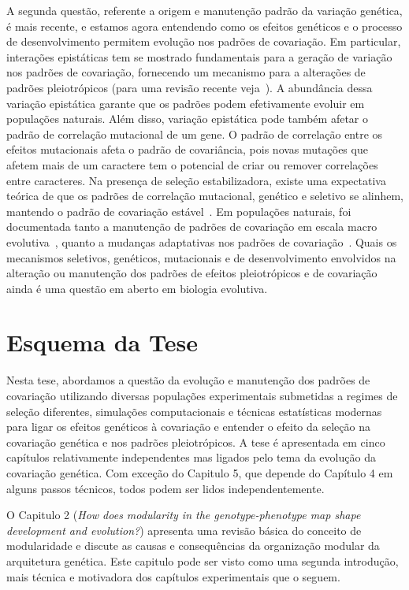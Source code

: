 \begin{refsection}
A segunda questão, referente a origem e manutenção padrão da variação
genética, é mais recente, e estamos agora entendendo como os efeitos genéticos
e o processo de desenvolvimento permitem evolução nos padrões de covariação.
Em particular, interações epistáticas tem se mostrado fundamentais para a
geração de variação nos padrões de covariação, fornecendo um mecanismo para a
alterações de padrões pleiotrópicos (para uma revisão recente
veja~\textcite{Pavlicev2015-up}). A abundância dessa variação epistática
garante que os padrões podem efetivamente evoluir em populações naturais. Além
disso, variação epistática pode também afetar o padrão de correlação
mutacional de um gene. O padrão de correlação entre os efeitos mutacionais
afeta o padrão de covariância, pois novas mutações que afetem mais de um
caractere tem o potencial de criar ou remover correlações entre caracteres. Na
presença de seleção estabilizadora, existe uma expectativa teórica de que os
padrões de correlação mutacional, genético e seletivo se alinhem, mantendo o
padrão de covariação estável~\parencite{Cheverud1984-mi}. Em populações
naturais, foi documentada tanto a manutenção de padrões de covariação em
escala macro evolutiva~\parencite{Marroig2001-ne}, quanto a mudanças
adaptativas nos padrões de covariação~\parencite{Young2005-nk}. Quais os
mecanismos seletivos, genéticos, mutacionais e de desenvolvimento envolvidos
na alteração ou manutenção dos padrões de efeitos pleiotrópicos e de
covariação ainda é uma questão em aberto em biologia evolutiva.

\section{Esquema da Tese} 

Nesta tese, abordamos a questão da evolução e manutenção dos padrões de
covariação utilizando diversas populações experimentais submetidas a regimes
de seleção diferentes, simulações computacionais e técnicas estatísticas
modernas para ligar os efeitos genéticos à covariação e entender o efeito da
seleção na covariação genética e nos padrões pleiotrópicos. A tese é
apresentada em cinco capítulos relativamente independentes mas ligados pelo
tema da evolução da covariação genética. Com exceção do Capitulo 5, que
depende do Capítulo 4 em alguns passos técnicos, todos podem ser lidos
independentemente.

O Capitulo 2 (\textit{How does modularity in the genotype-phenotype map shape
development and evolution?}) apresenta uma revisão básica do conceito de
modularidade e discute as causas e consequências da organização modular da
arquitetura genética. Este capitulo pode ser visto como uma segunda
introdução, mais técnica e motivadora dos capítulos experimentais que o seguem.


\end{refsection}
